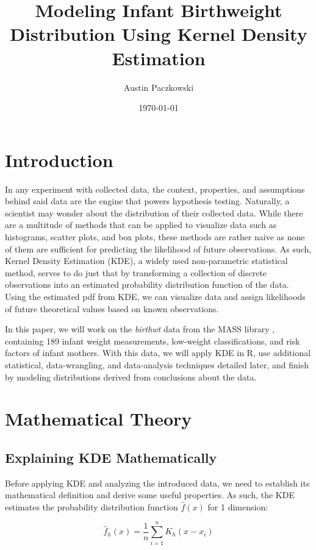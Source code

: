 \documentclass{article}
\title{Modeling Infant Birthweight Distribution Using Kernel Density Estimation}
\author{Austin Paczkowski}
\date{\today}
\begin{document}
\maketitle

\section{Introduction}

In any experiment with collected data, the context, properties, and assumptions behind said data are the engine that powers hypothesis testing. Naturally, a scientist may wonder about the distribution of their collected data. While there are a multitude of methods that can be applied to visualize data such as histograms, scatter plots, and box plots, these methods are rather naive as none of them are sufficient for predicting the likelihood of future observations. As such, Kernel Density Estimation (KDE), a widely used non-parametric statistical method, serves to do just that by transforming a collection of discrete observations into an estimated probability distribution function of the data. Using the estimated pdf from KDE, we can visualize data and assign likelihoods of future theoretical values based on known observations. 

In this paper, we will work on the \textit{birthwt} data from the MASS library \cite{masS}, containing 189 infant weight measurements, low-weight classifications, and risk factors of infant mothers. With this data, we will apply KDE in R, use additional statistical, data-wrangling, and data-analysis techniques detailed later, and finish by modeling distributions derived from conclusions about the data.

\section{Mathematical Theory}

\subsection{Explaining KDE Mathematically}

Before applying KDE and analyzing the introduced data, we need to establish its mathematical definition and derive some useful properties. As such, the KDE estimates the probability distribution function $\hat f(x)$ for 1 dimension:

\begin{equation}
    \hat f_h(x) = \frac{1}{n}\sum_{i=1}^n K_h(x - x_i)
\end{equation}
\end{document}
